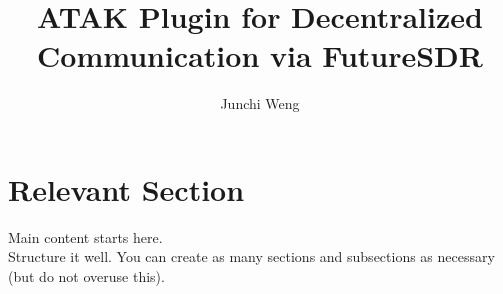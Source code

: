 \documentclass[sigconf]{acmart}
\begin{document}
\title{ATAK Plugin for Decentralized Communication via FutureSDR}


\author{Junchi Weng}

\renewcommand{\shortauthors}{J.Weng}

\begin{comment}
  \begin{abstract} %
    You may want to answer the following questions with roughly one sentence each.

    \begin{itemize}
    \item What is the topic of your main seminar paper?
    \item What problem does it solve?
    \item Why is that topic/problem important?
    \item What methodologies do the authors apply?
    \item What are the main contributions of the paper?
    \item What are the key findings/results of the paper?
    \end{itemize}
    
  \textbf{Hint 1:} You do not have to answer every question above. Consider only those that are relevant to your paper. 

  \end{abstract}
  ......
\end{comment}


\maketitle








\section{Relevant Section}
Main content starts here. \nocite{*} \\
Structure it well. You can create as many sections and subsections as necessary (but do not overuse this).
\end{document}
